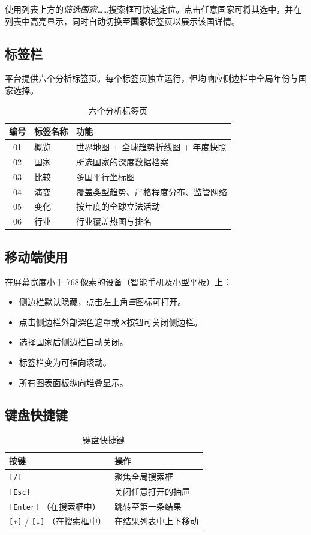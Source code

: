\documentclass[12pt,a4paper]{article}
\newcommand{\keycap}[1]{%
  \texttt{\footnotesize[#1]}%
}
\newcommand{\tabname}[1]{\textbf{\color{prismblue}#1}}
\newcommand{\uielem}[1]{\textit{#1}}
\begin{document}
使用列表上方的\uielem{筛选国家……}搜索框可快速定位。点击任意国家可将其选中，并在列表中高亮显示，同时自动切换至\tabname{国家}标签页以展示该国详情。

\subsection{标签栏}

平台提供六个分析标签页。每个标签页独立运行，但均响应侧边栏中全局年份与国家选择。

\begin{table}[h]
\centering
\begin{tabularx}{\linewidth}{clX}
\toprule
\textbf{编号} & \textbf{标签名称} & \textbf{功能} \\
\midrule
01 & 概览 & 世界地图 + 全球趋势折线图 + 年度快照 \\
02 & 国家 & 所选国家的深度数据档案 \\
03 & 比较 & 多国平行坐标图 \\
04 & 演变 & 覆盖类型趋势、严格程度分布、监管网络 \\
05 & 变化 & 按年度的全球立法活动 \\
06 & 行业 & 行业覆盖热图与排名 \\
\bottomrule
\end{tabularx}
\caption{六个分析标签页}
\end{table}

\subsection{移动端使用}

在屏幕宽度小于 768\,像素的设备（智能手机及小型平板）上：
\begin{itemize}
  \item 侧边栏默认隐藏，点击左上角\uielem{☰}图标可打开。
  \item 点击侧边栏外部深色遮罩或\uielem{✕}按钮可关闭侧边栏。
  \item 选择国家后侧边栏自动关闭。
  \item 标签栏变为可横向滚动。
  \item 所有图表面板纵向堆叠显示。
\end{itemize}

\subsection{键盘快捷键}

\begin{table}[h]
\centering
\begin{tabular}{ll}
\toprule
\textbf{按键} & \textbf{操作} \\
\midrule
\keycap{/} & 聚焦全局搜索框 \\
\keycap{Esc} & 关闭任意打开的抽屉 \\
\keycap{Enter}（在搜索框中） & 跳转至第一条结果 \\
\keycap{↑}/\keycap{↓}（在搜索框中） & 在结果列表中上下移动 \\
\bottomrule
\end{tabular}
\caption{键盘快捷键}
\end{table}
\end{document}
